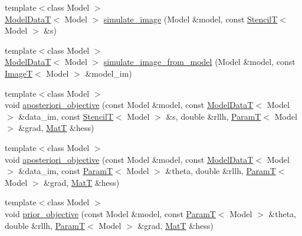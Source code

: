 \begin{DoxyCompactItemize}
\item 
{\footnotesize template$<$class Model $>$ }\\\hyperlink{namespacemappel_a97f050df953605381ae9c901c3b125f1}{Model\+DataT}$<$ Model $>$ \hyperlink{namespacemappel_1_1methods_af3db039a162d71bd04eb08b773035542}{simulate\+\_\+image} (Model \&model, const \hyperlink{namespacemappel_a3a06598240007876f8c4bf834ad86197}{StencilT}$<$ Model $>$ \&s)
\item 
{\footnotesize template$<$class Model $>$ }\\\hyperlink{namespacemappel_a97f050df953605381ae9c901c3b125f1}{Model\+DataT}$<$ Model $>$ \hyperlink{namespacemappel_1_1methods_a8ec3a0fdc71eed2a0bdfe33599f23623}{simulate\+\_\+image\+\_\+from\+\_\+model} (Model \&model, const \hyperlink{namespacemappel_a14658186b77757f3c35a69cb1be6cf4b}{ImageT}$<$ Model $>$ \&model\+\_\+im)
\item 
{\footnotesize template$<$class Model $>$ }\\void \hyperlink{namespacemappel_1_1methods_a5227b7c0f1c45c27cbebfcafefcab72b}{aposteriori\+\_\+objective} (const Model \&model, const \hyperlink{namespacemappel_a97f050df953605381ae9c901c3b125f1}{Model\+DataT}$<$ Model $>$ \&data\+\_\+im, const \hyperlink{namespacemappel_a3a06598240007876f8c4bf834ad86197}{StencilT}$<$ Model $>$ \&s, double \&rllh, \hyperlink{namespacemappel_a667925cb0d6c0e49f2f035cc5a9a6857}{ParamT}$<$ Model $>$ \&grad, \hyperlink{namespacemappel_a7091ab87c528041f7e2027195fad8915}{MatT} \&hess)
\item 
{\footnotesize template$<$class Model $>$ }\\void \hyperlink{namespacemappel_1_1methods_a3b0e13b783d21c08ba063a210b0a344b}{aposteriori\+\_\+objective} (const Model \&model, const \hyperlink{namespacemappel_a97f050df953605381ae9c901c3b125f1}{Model\+DataT}$<$ Model $>$ \&data\+\_\+im, const \hyperlink{namespacemappel_a667925cb0d6c0e49f2f035cc5a9a6857}{ParamT}$<$ Model $>$ \&theta, double \&rllh, \hyperlink{namespacemappel_a667925cb0d6c0e49f2f035cc5a9a6857}{ParamT}$<$ Model $>$ \&grad, \hyperlink{namespacemappel_a7091ab87c528041f7e2027195fad8915}{MatT} \&hess)
\item 
{\footnotesize template$<$class Model $>$ }\\void \hyperlink{namespacemappel_1_1methods_a275f2b0364c48bfc7e6f88e866d593bd}{prior\+\_\+objective} (const Model \&model, const \hyperlink{namespacemappel_a667925cb0d6c0e49f2f035cc5a9a6857}{ParamT}$<$ Model $>$ \&theta, double \&rllh, \hyperlink{namespacemappel_a667925cb0d6c0e49f2f035cc5a9a6857}{ParamT}$<$ Model $>$ \&grad, \hyperlink{namespacemappel_a7091ab87c528041f7e2027195fad8915}{MatT} \&hess)

\end{DoxyCompactItemize}
